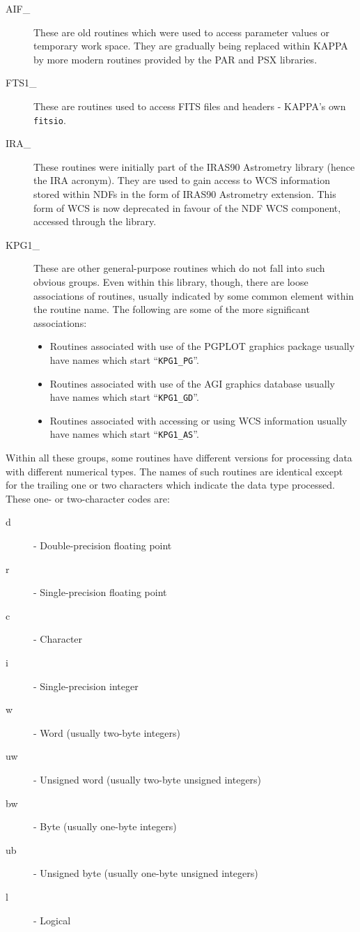 \documentclass[11pt]{starlink}
\begin{document}
\begin{description}

\item [AIF\_] These are old routines which were used to access parameter
values or temporary work space. They are gradually being replaced within
KAPPA by more modern routines provided by the PAR and PSX libraries.

\item [FTS1\_] These are routines used to access FITS files and headers -
KAPPA's own \texttt{fitsio}.

\item [IRA\_] These routines were initially part of the IRAS90 Astrometry
library (hence the IRA acronym). They are used to gain access to WCS
information stored within NDFs in the form of IRAS90 Astrometry extension.
This form of WCS is now deprecated in favour of the NDF WCS component,
accessed through the  library.

\item [KPG1\_] These are other general-purpose routines which do not fall
into such obvious groups.  Even within this library, though, there are
loose associations of routines, usually indicated by some common element
within the routine name. The following are some of the more significant
associations:

\begin{itemize}
\item Routines associated with use of the PGPLOT graphics package usually
have names which start ``\texttt{KPG1\_PG}''.
\item Routines associated with use of the AGI graphics database usually
have names which start ``\texttt{KPG1\_GD}''.
\item Routines associated with accessing or using WCS information usually
have names which start ``\texttt{KPG1\_AS}''.
\end{itemize}

\end{description}

Within all these groups, some routines have different versions for
processing data with different numerical types. The names of such
routines are identical except for the trailing one or two characters
which indicate the data type processed. These one- or two-character
codes are:

\begin{description}
\item [d] - Double-precision floating point
\item [r] - Single-precision floating point
\item [c] - Character
\item [i] - Single-precision integer
\item [w] - Word (usually two-byte integers)
\item [uw] - Unsigned word (usually two-byte unsigned integers)
\item [bw] - Byte (usually one-byte integers)
\item [ub] - Unsigned byte (usually one-byte unsigned integers)
\item [l] - Logical
\end{description}
\end{document}
